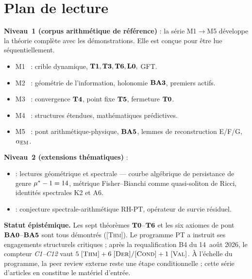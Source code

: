 \section{Plan de lecture}
\label{sec:plan}

\textbf{Niveau~1 (corpus arithmétique de référence)} : la série M1$\to$M5 développe la théorie complète avec les démonstrations. Elle est conçue pour être lue séquentiellement.
\begin{itemize}[nosep,leftmargin=*]
\item M1~\cite{companion_M1} : crible dynamique, $\textbf{T1}, \textbf{T3}, \textbf{T6}, \textbf{L0},$ GFT.
\item M2~\cite{companion_M2} : géométrie de l'information, holonomie $\textbf{BA3}$, premiers actifs.
\item M3~\cite{companion_M3} : convergence $\textbf{T4}$, point fixe $\textbf{T5}$, fermeture $\textbf{T0}$.
\item M4~\cite{companion_M4} : structures étendues, mathématiques prédictives.
\item M5~\cite{companion_M5} : pont arithmétique-physique, $\textbf{BA5}$, lemmes de reconstruction E/F/G, $\alpha_{\rm EM}$.
\end{itemize}

\textbf{Niveau~2 (extensions thématiques)} :
\begin{itemize}[nosep,leftmargin=*]
\item \cite{PT_GeoSpectral} : lectures géométrique et spectrale --- courbe algébrique de persistance de genre $\mu^{*} - 1 = 14$, métrique Fisher--Bianchi comme quasi-soliton de Ricci, identités spectrales K2 et A6.
\item \cite{PT_RH} : conjecture spectrale-arithmétique RH-PT, opérateur de survie résiduel.
\end{itemize}

\textbf{Statut épistémique.} Les sept théorèmes $\textbf{T0}$--$\textbf{T6}$ et les six axiomes de pont $\textbf{BA0}$--$\textbf{BA5}$ sont tous démontrés (\textsc{[Thm]}). Le programme PT a instruit ses engagements structurels critiques ; après la requalification B4 du 14~août 2026, le compteur \emph{C1--C12} vaut $5\;\textsc{[Thm]} + 6\;\textsc{[Der]}/\textsc{[Cond]} + 1\;\textsc{[Val]}$. À l'échelle du programme, la peer review externe reste une étape conditionnelle ; cette série d'articles en constitue le matériel d'entrée.

\printbibliography


